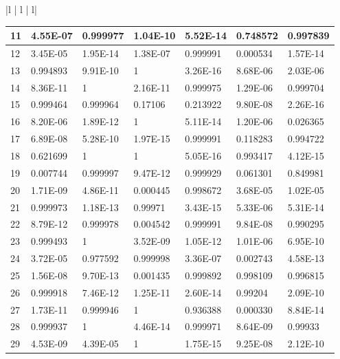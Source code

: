 \documentclass[a4paper,10pt]{article}
\begin{document}
{\begin{tabular}{ |l | l | l| }
\begin{centering}
{\begin{tabular}{ |l|l|l|l|l|l|l| }
11	       & 4.55E-07 & 0.999977 & 1.04E-10 & 5.52E-14 & 0.748572 & 0.997839 \\ \hline                
12	       & 3.45E-05 & 1.95E-14 & 1.38E-07 & 0.999991 & 0.000534 & 1.57E-14 \\ \hline         
13	       & 0.994893 & 9.91E-10 & 1 	    & 3.26E-16 & 8.68E-06 & 2.03E-06 \\ \hline        
14	       & 8.36E-11 & 1        & 2.16E-11 & 0.999975 & 1.29E-06 & 0.999704 \\ \hline               
15	       & 0.999464 & 0.999964 & 0.17106  & 0.213922 & 9.80E-08 & 2.26E-16 \\ \hline               
16	       & 8.20E-06 & 1.89E-12 & 1  	    & 5.11E-14 & 1.20E-06 & 0.026365 \\ \hline             
17	       & 6.89E-08 & 5.28E-10 & 1.97E-15 & 0.999991 & 0.118283 & 0.994722 \\ \hline              
18	       & 0.621699 & 1        & 1   	    & 5.05E-16 & 0.993417 & 4.12E-15 \\ \hline             
19	       & 0.007744 & 0.999997 & 9.47E-12 & 0.999929 & 0.061301 & 0.849981 \\ \hline                
20	       & 1.71E-09 & 4.86E-11 & 0.000445 & 0.998672 & 3.68E-05 & 1.02E-05 \\ \hline      
21	       & 0.999973 & 1.18E-13 & 0.99971  & 3.43E-15 & 5.33E-06 & 5.31E-14 \\ \hline      
22	       & 8.79E-12 & 0.999978 & 0.004542 & 0.999991 & 9.84E-08 & 0.990295 \\ \hline       
23	       & 0.999493 & 1        & 3.52E-09 & 1.05E-12 & 1.01E-06 & 6.95E-10 \\ \hline               
24	       & 3.72E-05 & 0.977592 & 0.999998 & 3.36E-07 & 0.002743 & 4.58E-13 \\ \hline             
25	       & 1.56E-08 & 9.70E-13 & 0.001435 & 0.999892 & 0.998109 & 0.996815 \\ \hline             
26	       & 0.999918 & 7.46E-12 & 1.25E-11 & 2.60E-14 & 0.99204  & 2.09E-10 \\ \hline            
27	       & 1.73E-11 & 0.999946 & 1        & 0.936388 & 0.000330 & 8.84E-14 \\ \hline             
28	       & 0.999937 & 1        & 4.46E-14 & 0.999971 & 8.64E-09 & 0.99933  \\ \hline            
29	       & 4.53E-09 & 4.39E-05 & 1        & 1.75E-15 & 9.25E-08 & 2.12E-10 \\ \hline                

\end{tabular}}
\end{centering}
\end{tabular}}
\end{document}
